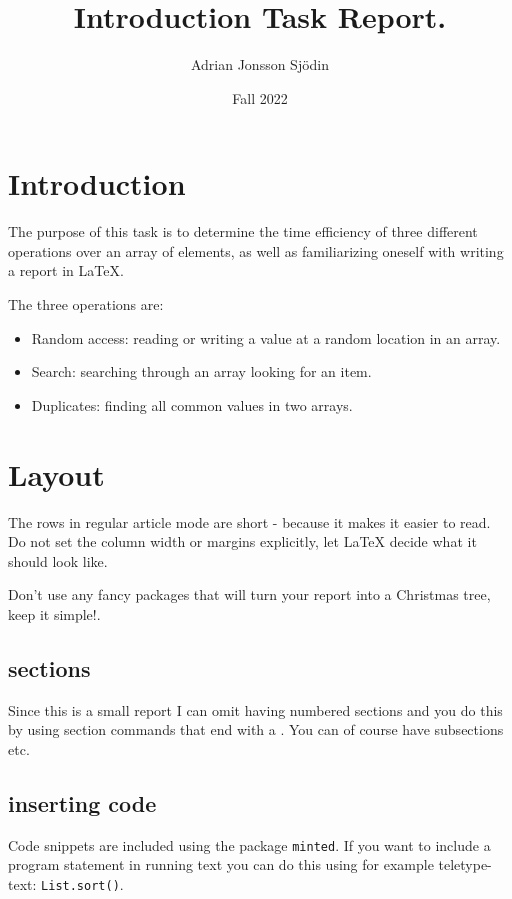 \documentclass[a4paper,11pt]{article}
\begin{document}
\title{
  \textbf{Introduction Task Report.}
}
\author{Adrian Jonsson Sjödin}
\date{Fall 2022}

\maketitle

\section*{Introduction}

The purpose of this task is to determine the time efficiency of three different operations
over an array of elements, as well as familiarizing oneself with writing a report in \LaTeX.

The three operations are:
\begin{itemize}
  \item Random access: reading or writing a value at a random location in an array.
  \item Search: searching through an array looking for an item.
  \item Duplicates: finding all common values in two arrays.
\end{itemize}

\section*{Layout}

The rows in regular article mode are short - because it makes it
easier to read. Do not set the column width or margins explicitly, let
LaTeX decide what it should look like.

Don't use any fancy packages that will turn your report into a
Christmas tree, keep it simple!.

\subsection*{sections}

Since this is a small report I can omit having numbered sections and
you do this by using section commands that end with a {\tt *}. You can
of course have subsections etc.


\subsection*{inserting code}

Code snippets are included using the package {\tt minted}. If you
want to include a program statement in running text you can do this
using for example teletype-text: {\tt List.sort()}.
\end{document}
